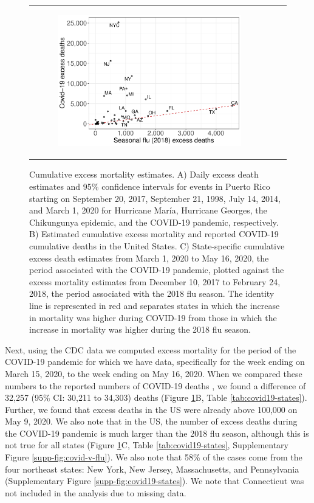 \documentclass[11pt]{article}
\begin{document}
\begin{figure}[ht]
\begin{tabular}{lll}
\begin{subfigure}[t]{0.3\linewidth}
		\includegraphics[width=1\linewidth]{figs/figure-2c-covid-v-flu.pdf}
	\end{subfigure}\\
	\end{tabular}
    \caption{Cumulative excess mortality estimates. A) Daily excess death estimates and 95\% confidence intervals for events in Puerto Rico starting on September 20, 2017, September 21, 1998, July 14, 2014, and March 1, 2020 for Hurricane Mar\'ia, Hurricane Georges, the Chikungunya epidemic, and the COVID-19 pandemic, respectively.  B) Estimated cumulative excess mortality and reported COVID-19 cumulative deaths in the United States. C) State-specific cumulative excess death estimates from March 1, 2020 to May 16, 2020, the period associated with the COVID-19 pandemic, plotted against the excess mortality estimates from December 10, 2017 to February 24, 2018, the period associated with the 2018 flu season. The identity line is represented in red and separates states in which the increase in mortality was higher during COVID-19 from those in which the increase in mortality was higher during the 2018 flu season.}
    \label{fig:excess-deaths}
\end{figure}

Next, using the CDC data we computed excess mortality for the period of the COVID-19 pandemic for which we have data, specifically for the week ending on March 15, 2020, to the week ending on May 16, 2020. When we compared these numbers to the reported numbers of COVID-19 deaths \cite{smith2020coronavirus}, we found a difference of 32,257 (95\% CI: 30,211 to 34,303) deaths (Figure \ref{fig:excess-deaths}B, Table \ref{tab:covid19-states}). Further, we found that excess deaths in the US were already above 100,000 on May 9, 2020. We also note that in the US, the number of excess deaths during the COVID-19 pandemic is much larger than the 2018 flu season, although this is not true for all states (Figure \ref{fig:excess-deaths}C, Table \ref{tab:covid19-states}, Supplementary Figure \ref{supp-fig:covid-v-flu}). We also note that 58\% of the cases come from the four northeast states: New York, New Jersey, Massachusetts, and Pennsylvania (Supplementary Figure \ref{supp-fig:covid19-states}). We note that Connecticut was not included in the analysis due to missing data.
\end{document}
